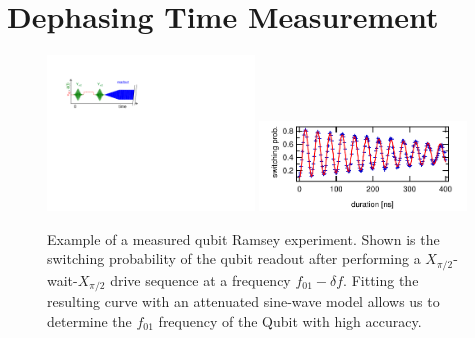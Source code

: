 \section{Dephasing Time Measurement}

\begin{figure}[ht!]
\centering
\includegraphics[width=0.49\textwidth]{"./material/figures/measurement/qubit_ramsey_oscillation"}
\includegraphics[width=0.49\textwidth]{"./data/ct5/2011_04_21 - grover and tomo/example - qubit 2 ramsey"}
\caption[]{Example of a measured qubit Ramsey experiment. Shown is the switching probability of the qubit readout after performing a $X_{\pi/2}$-wait-$X_{\pi/2}$ drive sequence at a frequency $f_{01}-\delta f$. Fitting the resulting curve with an attenuated sine-wave model allows us to determine the $f_{01}$ frequency of the Qubit with high accuracy.}
\label{fig:qubit_ramsey_example}
\end{figure}


